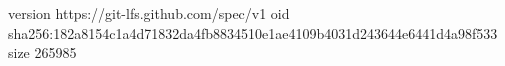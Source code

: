 version https://git-lfs.github.com/spec/v1
oid sha256:182a8154c1a4d71832da4fb8834510e1ae4109b4031d243644e6441d4a98f533
size 265985
